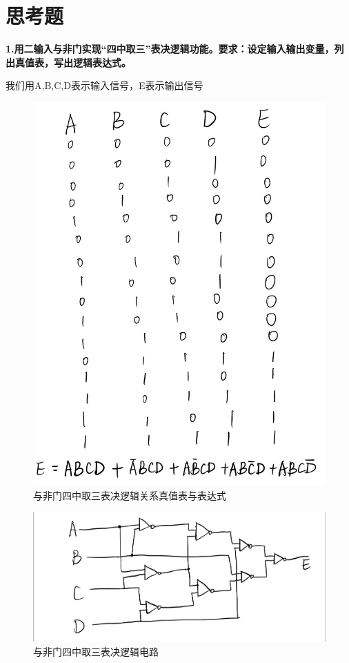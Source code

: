 \documentclass[a4 paper,12pt]{article}
\begin{document}
	\section{思考题}
	\noindent
	\textbf{1.用二输入与非门实现“四中取三”表决逻辑功能。要求：设定输入输出变量，列出真值表，写出逻辑表达式。}
    \par 我们用A,B,C,D表示输入信号，E表示输出信号
        \begin{figure}[H]
        		\centering
        		\hspace{2em}\includegraphics[width=.6\linewidth]{pic/4.jpg}
        		\caption{与非门四中取三表决逻辑关系真值表与表达式
        		}
        	\end{figure}
                \begin{figure}[H]
                		\centering
                		\hspace{2em}\includegraphics[width=.6\linewidth]{pic/5.jpg}
                		\caption{与非门四中取三表决逻辑电路
                		}
                	\end{figure}
\end{document}
